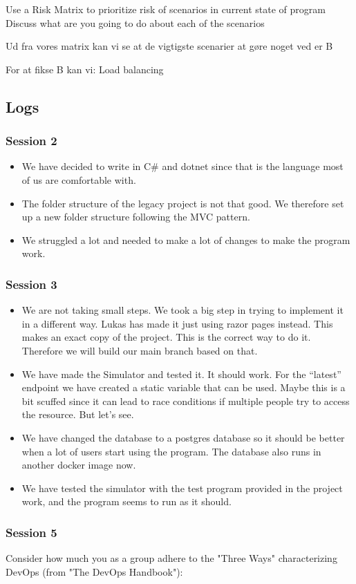 Use a Risk Matrix to prioritize risk of scenarios in current state of program
Discuss what are you going to do about each of the scenarios

Ud fra vores matrix kan vi se at de vigtigste scenarier at gøre noget ved er B

For at fikse B kan vi:
Load balancing


\subsection{Logs}
\subsubsection{Session 2}
\begin{itemize}
    \item We have decided to write in C\# and dotnet since that is the language most of us are comfortable with.
    \item The folder structure of the legacy project is not that good. We therefore set up a new folder structure following the MVC pattern.
    \item We struggled a lot and needed to make a lot of changes to make the program work. 
\end{itemize}

\subsubsection{Session 3}
\begin{itemize}
    \item We are not taking small steps. We took a big step in trying to implement it in a different way. Lukas has made it just using razor pages instead. This makes an exact copy of the project. This is the correct way to do it. Therefore we will build our main branch based on that.
    \item We have made the Simulator and tested it. It should work. For the “latest” endpoint we have created a static variable that can be used. Maybe this is a bit scuffed since it can lead to race conditions if multiple people try to access the resource. But let's see.
    \item We have changed the database to a postgres database so it should be better when a lot of users start using the program. The database also runs in another docker image now.
    \item We have tested the simulator with the test program provided in the project work, and the program seems to run as it should.
\end{itemize}

\subsubsection{Session 5}
Consider how much you as a group adhere to the "Three Ways" characterizing DevOps (from "The DevOps Handbook"):
